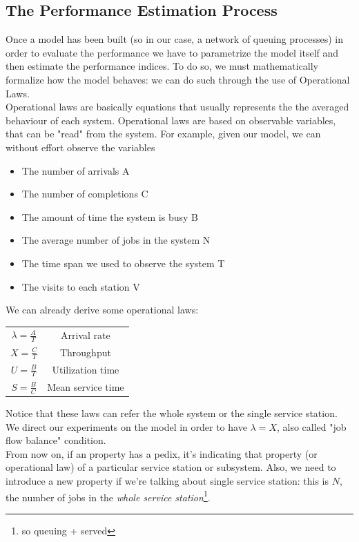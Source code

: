 \documentclass[10pt,a4paper]{article}
\begin{document}
			\subsection{The Performance Estimation Process}
				Once a model has been built (so in our case, a network of queuing processes) in order to evaluate the performance we have to parametrize the model itself and then estimate the performance indices. To do so, we must mathematically formalize how the model behaves: we can do such through the use of Operational Laws.\\
				Operational laws are basically equations that usually represents the the averaged behaviour of each system. Operational laws are based on observable variables, that can be "read" from the system. For example, given our model, we can without effort observe the variables
				\begin{itemize}
					\item The number of arrivals A
					\item The number of completions C
					\item The amount of time the system is busy B
					\item The average number of jobs in the system N
					\item The time span we used to observe the system T
					\item The visits to each station V
				\end{itemize}
				We can already derive some operational laws:
				\begin{center}
					\begin{tabular}{ | c | c |}
						\hline
						$ \lambda = \frac{A}{T} $ & Arrival rate \\
						$ X = \frac{C}{T} $ & Throughput \\
						$ U = \frac{B}{T} $ & Utilization time \\
						$ S = \frac{B}{C} $ & Mean service time\\
						\hline
					\end{tabular}
				\end{center}

				Notice that these laws can refer the whole system or the single service station. We direct our experiments on the model in order to have $\lambda = X$, also called "job flow balance" condition.\\
				From now on, if an property has a pedix, it's indicating that property (or operational law) of a particular service station or subsystem. Also, we need to introduce a new property if we're talking about single service station: this is $N$, the number of jobs in the \emph{whole service station}\footnote{so queuing + served}.
				
\end{document}
